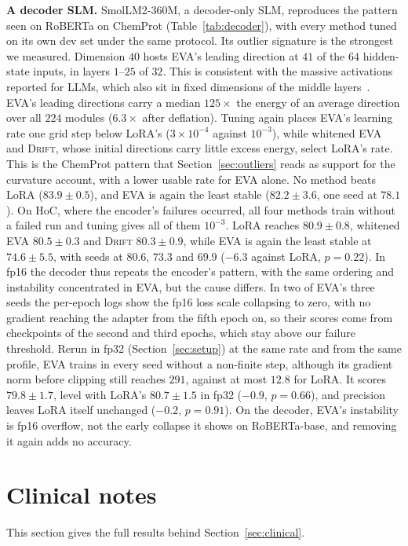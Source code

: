 \documentclass[conference,onecolumn]{IEEEtran}
\newcommand{\method}{\textsc{Drift}}
\begin{document}
\noindent\textbf{A decoder SLM.} SmolLM2-360M, a decoder-only SLM, reproduces
the pattern seen on RoBERTa on ChemProt (Table~\ref{tab:decoder}), with every
method tuned on its own dev set under the same protocol. Its outlier signature
is the strongest we measured. Dimension $40$ hosts EVA's leading direction at
$41$ of the $64$ hidden-state inputs, in layers $1$--$25$ of $32$. This is
consistent with the massive activations reported for LLMs, which also sit in
fixed dimensions of the middle layers~\cite{sun2024massive}. EVA's leading
directions carry a median $125\times$ the energy of an average direction over
all $224$ modules ($6.3\times$ after deflation). Tuning again places EVA's
learning rate one grid step below LoRA's ($3\times10^{-4}$ against $10^{-3}$),
while whitened EVA and \method{}, whose initial directions carry little excess
energy, select LoRA's rate. This is the ChemProt pattern that
Section~\ref{sec:outliers} reads as support for the curvature account, with a
lower usable rate for EVA alone. No
method beats LoRA ($83.9\pm0.5$), and EVA is again the least stable
($82.2\pm3.6$, one seed at $78.1$). On HoC, where the encoder's failures
occurred, all four methods train without a failed run and tuning gives all of
them $10^{-3}$. LoRA reaches
$80.9\pm0.8$, whitened EVA $80.5\pm0.3$ and \method{} $80.3\pm0.9$, while EVA is
again the least stable at $74.6\pm5.5$, with seeds at $80.6$, $73.3$ and $69.9$
($-6.3$ against LoRA, $p = 0.22$). In fp16 the decoder thus repeats the
encoder's pattern, with the same ordering and instability concentrated in EVA,
but the cause differs. In two of EVA's three seeds the per-epoch logs show the
fp16 loss scale collapsing to zero, with no gradient reaching the adapter from
the fifth epoch on, so their scores come from checkpoints of the second and
third epochs, which stay above our failure threshold. Rerun in fp32
(Section~\ref{sec:setup}) at the same rate and from the same profile, EVA trains
in every seed without a non-finite step, although its gradient norm before
clipping still reaches $291$, against at most $12.8$ for LoRA. It scores
$79.8\pm1.7$, level with LoRA's $80.7\pm1.5$ in fp32 ($-0.9$, $p = 0.66$), and
precision leaves LoRA itself unchanged ($-0.2$, $p = 0.91$). On the decoder,
EVA's instability is fp16 overflow, not the early collapse it shows on
RoBERTa-base, and removing it again adds no accuracy.

\section{Clinical notes}
\label{sup:clinical}
This section gives the full results behind Section~\ref{sec:clinical}.
\end{document}
